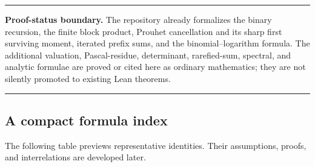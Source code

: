 \documentclass[11pt,oneside]{article}
\theoremstyle{definition}
\theoremstyle{remark}
\newenvironment{boxedremark}{%
  \par\smallskip\noindent\begin{center}\begin{minipage}{0.94\textwidth}%
  \color{black}\hrule\vspace{0.6em}\small
}{%
  \vspace{0.6em}\hrule\end{minipage}\end{center}\smallskip
}
\begin{document}
\begin{boxedremark}
\textbf{Proof-status boundary.}
The repository already formalizes the binary recursion, the finite block product, Prouhet
cancellation and its sharp first surviving moment, iterated prefix sums, and the
binomial--logarithm formula.  The additional valuation, Pascal-residue, determinant,
rarefied-sum, spectral, and analytic formulae are proved or cited here as ordinary
mathematics; they are not silently promoted to existing Lean theorems.
\end{boxedremark}

\subsection{A compact formula index}

The following table previews representative identities.  Their assumptions, proofs, and
interrelations are developed later.
\end{document}
